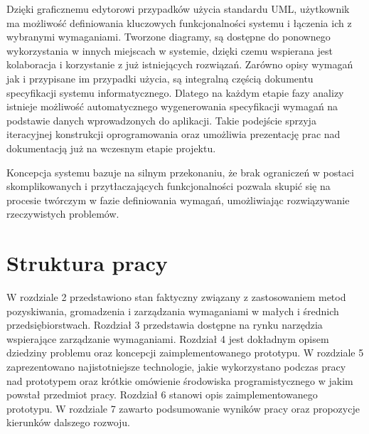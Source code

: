       Dzięki graficznemu edytorowi przypadków użycia standardu UML, użytkownik ma możliwość definiowania kluczowych funkcjonalności systemu i łączenia ich z wybranymi wymaganiami. Tworzone diagramy, są dostępne do ponownego wykorzystania w innych miejscach w systemie, dzięki czemu wspierana jest kolaboracja i korzystanie z już istniejących rozwiązań. Zarówno opisy wymagań jak i przypisane im przypadki użycia, są integralną częścią dokumentu specyfikacji systemu informatycznego. Dlatego na każdym etapie fazy analizy istnieje możliwość automatycznego wygenerowania specyfikacji wymagań na podstawie danych wprowadzonych do aplikacji. Takie podejście sprzyja iteracyjnej konstrukcji oprogramowania oraz umożliwia prezentację prac nad dokumentacją już na wczesnym etapie projektu. 

      Koncepcja systemu bazuje na silnym przekonaniu, że brak ograniczeń w postaci skomplikowanych i przytłaczających funkcjonalności pozwala skupić się na procesie twórczym w fazie definiowania wymagań, umożliwiając rozwiązywanie rzeczywistych problemów. 

    \section{Struktura pracy}

      W rozdziale 2 przedstawiono stan faktyczny związany z zastosowaniem metod pozyskiwania, gromadzenia i zarządzania wymaganiami w małych i średnich przedsiębiorstwach. Rozdział 3 przedstawia dostępne na rynku narzędzia wspierające zarządzanie wymaganiami. Rozdział 4 jest dokładnym opisem dziedziny problemu oraz koncepcji zaimplementowanego prototypu. W rozdziale 5 zaprezentowano najistotniejsze technologie, jakie wykorzystano podczas pracy nad prototypem oraz krótkie omówienie środowiska programistycznego w jakim powstał przedmiot pracy. Rozdział 6 stanowi opis zaimplementowanego prototypu. W rozdziale 7 zawarto podsumowanie wyników pracy oraz propozycje kierunków dalszego rozwoju. 
